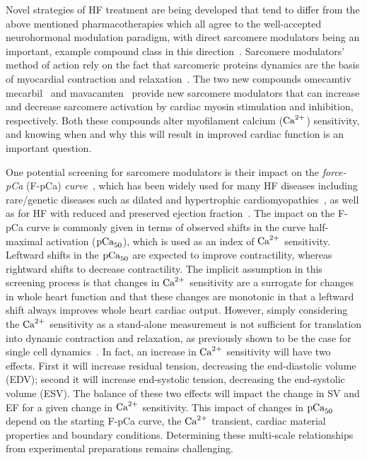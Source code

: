 Novel strategies of HF treatment are being developed that tend to differ from the above mentioned pharmacotherapies which all agree to the well-accepted neurohormonal modulation paradigm, with direct sarcomere modulators being an important, example compound class in this direction~\cite{Tsukamoto:2020}. Sarcomere modulators' method of action rely on the fact that sarcomeric proteins dynamics are the basis of myocardial contraction and relaxation~\cite{Solaro:1998}. The two new compounds omecamtiv mecarbil~\cite{Teerlink:2016} and mavacamten~\cite{Olivotto:2020} provide new sarcomere modulators that can increase and decrease sarcomere activation by cardiac myosin stimulation and inhibition, respectively. Both these compounds alter myofilament calcium ($\textrm{Ca}^{2+}$) sensitivity, and knowing when and why this will result in improved cardiac function is an important question.

One potential screening for sarcomere modulators is their impact on the \textit{force-pCa} (F-pCa) \textit{curve}~\cite{Walker:2010}, which has been widely used for many HF diseases including rare/genetic diseases such as dilated and hypertrophic cardiomyopathies~\cite{Groen:2020,Bai:2013,Michael:2016,Kirschner:2005,Harris:2002}, as well as for HF with reduced and preserved ejection fraction~\cite{Nagy:2015,Kampourakis:2018,Kieu:2019,Awinda:2021,Mamidi:2018,Sparrow:2020}. The impact on the F-pCa curve is commonly given in terms of observed shifts in the curve half-maximal activation ($\textrm{pCa}_{50}$), which is used as an index of $\textrm{Ca}^{2+}$ sensitivity. Leftward shifts in the $\textrm{pCa}_{50}$ are expected to improve contractility, whereas rightward shifts to decrease contractility. The implicit assumption in this screening process is that changes in $\textrm{Ca}^{2+}$ sensitivity are a surrogate for changes in whole heart function and that these changes are monotonic in that a leftward shift always improves whole heart cardiac output. However, simply considering the $\textrm{Ca}^{2+}$ sensitivity as a stand-alone measurement is not sufficient for translation into dynamic contraction and relaxation, as previously shown to be the case for single cell dynamics~\cite{Chung:2016}. In fact, an increase in $\textrm{Ca}^{2+}$ sensitivity will have two effects. First it will increase residual tension, decreasing the end-diastolic volume (EDV); second it will increase end-systolic tension, decreasing the end-systolic volume (ESV). The balance of these two effects will impact the change in SV and EF for a given change in $\textrm{Ca}^{2+}$ sensitivity. This impact of changes in $\textrm{pCa}_{50}$ depend on the starting F-pCa curve, the $\textrm{Ca}^{2+}$ transient, cardiac material properties and boundary conditions. Determining these multi-scale relationships from experimental preparations remains challenging.

